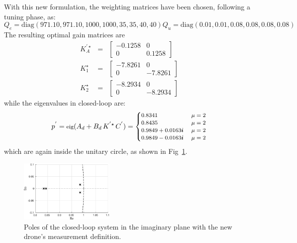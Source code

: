 \documentclass{ifacconf}
\begin{document}
With this new formulation, the weighting matrices have been chosen, 
following a tuning phase, as:
\begin{subequations}
    \begin{equation}
        Q_e = \text{diag}(971.10, 971.10, 1000, 1000, 35,35,40,40)
    \end{equation} 
    \begin{equation}
        Q_u = \text{diag}(0.01,0.01, 0.08, 0.08, 0.08, 0.08)
    \end{equation} 
\end{subequations}
The resulting optimal gain matrices are 
\begin{eqnarray}
    K^{'\star}_A &=& \begin{bmatrix}
        -0.1258 &  0  \\
         0 &  0.1258
    \end{bmatrix}\\
    K^{\star}_1 &=& \begin{bmatrix}
        -7.8261 & 0 \\
         0   & -7.8261
    \end{bmatrix}\\
    K^\star_2 &=& \begin{bmatrix}
        -8.2934  & 0 \\
         0   & -8.2934 
    \end{bmatrix}
\end{eqnarray}
while the eigenvalues in closed-loop are:
\begin{equation}
    \small
    p^{'} = \text{eig}(A_d + B_d \, K^{'\star} \, C^{'}) = 
    \begin{cases}
        0.8341 \ & \mu = 2\\
        0.8435 \ & \mu = 2\\
        0.9849 +  0.0163\boldsymbol{i} \  &   \mu = 2\\
        0.9849 -  0.0163\boldsymbol{i} \  &   \mu = 2
    \end{cases}
\end{equation}
which are again inside the unitary circle, 
as shown in Fig~\ref{fig:poles-simulation-v2}.
\begin{figure}
    \centering
    \includegraphics[height=3cm]{images/experiment/poles_experiment_zoom.eps}
    \vspace{-0.3cm}
    \caption{Poles of the closed-loop system in the imaginary plane with the new 
    drone's measurement definition.}
    \label{fig:poles-simulation-v2}
\end{figure}
\end{document}
